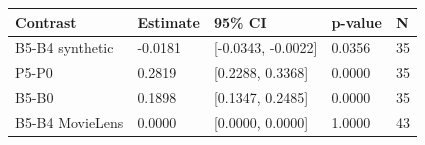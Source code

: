\begin{tabular}{lllll}
\toprule
Contrast & Estimate & 95\% CI & p-value & N \\
\midrule
B5-B4 synthetic & -0.0181 & [-0.0343, -0.0022] & 0.0356 & 35 \\
P5-P0 & 0.2819 & [0.2288, 0.3368] & 0.0000 & 35 \\
B5-B0 & 0.1898 & [0.1347, 0.2485] & 0.0000 & 35 \\
B5-B4 MovieLens & 0.0000 & [0.0000, 0.0000] & 1.0000 & 43 \\
\bottomrule
\end{tabular}
